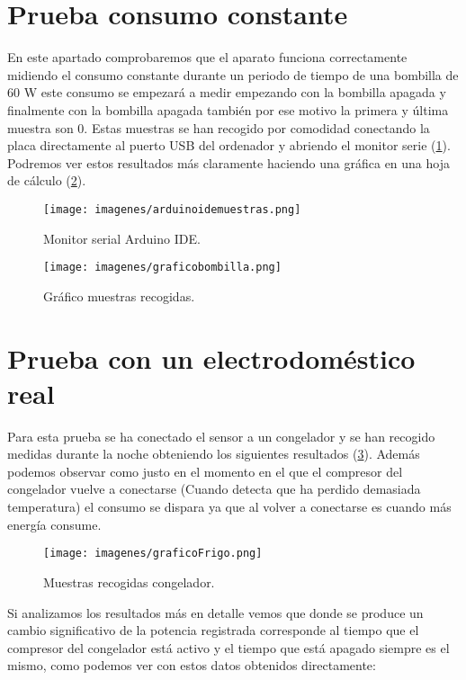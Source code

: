 \section{Prueba consumo constante}

En este apartado comprobaremos que el aparato funciona correctamente midiendo el consumo constante durante un periodo de tiempo de una bombilla de 60 W este consumo se empezará a medir empezando con la bombilla apagada y finalmente con la bombilla apagada también por ese motivo la primera y última muestra son 0. Estas muestras se han recogido por comodidad conectando la placa directamente al puerto USB del ordenador y abriendo el monitor serie (\ref{fig:monitorserial}). Podremos ver estos resultados más claramente haciendo una gráfica en una hoja de cálculo (\ref{fig:graficobombilla}). 

\begin{figure}[H]
	\centering
	\texttt{[image: imagenes/arduinoidemuestras.png]}
	\caption{Monitor serial Arduino IDE.}
	\label{fig:monitorserial}
\end{figure}

\begin{figure}[H]
	\centering
	\texttt{[image: imagenes/graficobombilla.png]}
	\caption{Gráfico muestras recogidas.}
	\label{fig:graficobombilla}
\end{figure}

\section{Prueba con un electrodoméstico real}

Para esta prueba se ha conectado el sensor a un congelador y se han recogido medidas durante la noche obteniendo los siguientes resultados (\ref{fig:graficocongelador}). Además podemos observar como justo en el momento en el que el compresor del congelador vuelve a conectarse (Cuando detecta que ha perdido demasiada temperatura) el consumo se dispara ya que al volver a conectarse es cuando más energía consume.

\begin{figure}[H]
	\centering
	\texttt{[image: imagenes/graficoFrigo.png]}
	\caption{Muestras recogidas congelador.}
	\label{fig:graficocongelador}
\end{figure}

 Si analizamos los resultados más en detalle vemos que donde se produce un cambio significativo de la potencia registrada corresponde al tiempo que el compresor del congelador está activo y el tiempo que está apagado siempre es el mismo, como podemos ver con estos datos obtenidos directamente:

